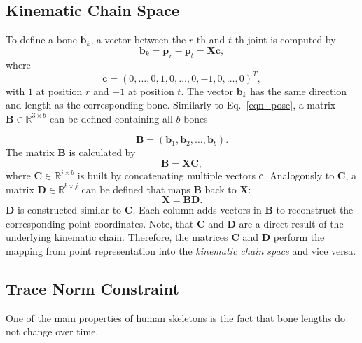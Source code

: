 \documentclass[10pt,letterpaper]{article}
\begin{document}
\subsection{Kinematic Chain Space}
\label{sec_bone_space}
To define a bone $\bm{b}_k$, a vector between the $r$-th and $t$-th joint is computed by
\begin{equation}
\label{eqn_bone_diff}
\bm{b}_k=\bm{p}_r-\bm{p}_t=\bm{X}\bm{c}
,
\end{equation}
where
\begin{equation}
\bm{c}=(0,\dots, 0, 1, 0, \dots, 0 ,-1 ,0 ,\dots,0)^T
,
\end{equation}
with $1$ at position $r$ and $-1$ at position $t$. The vector $\bm{b}_k$ has the same direction and length as the corresponding bone. Similarly to Eq.~\eqref{eqn_pose}, a matrix $\bm{B} \in \mathbb{R}^{3\times b}$ can be defined containing all $b$ bones

\begin{equation}
\label{eqn_bone}
\bm{B}=(\bm{b}_1, \bm{b}_2, \dots, \bm{b}_b)
.
\end{equation}
The matrix $\bm{B}$ is calculated by 
\begin{equation}
\label{eqn_kin_space}
\bm{B}=\bm{X}\bm{C}
,
\end{equation}
where $\bm{C}\in \mathbb{R}^{j\times b}$ is built by concatenating multiple vectors $\bm{c}$. Analogously to $\bm{C}$, a matrix $\bm{D}\in \mathbb{R}^{b\times j}$ can be defined that maps $\bm{B}$ back to $\bm{X}$:
\begin{equation}
\label{eqn_map_bone_to_point}
\bm{X}=\bm{B}\bm{D}
.
\end{equation}
$\bm{D}$ is constructed similar to $\bm{C}$. Each column adds vectors in $\bm{B}$ to reconstruct the corresponding point coordinates. Note, that $\bm{C}$ and $\bm{D}$ are a direct result of the underlying kinematic chain. Therefore, the matrices $\bm{C}$ and $\bm{D}$ perform the mapping from point representation into the \textit{kinematic chain space} and vice versa.

\subsection{Trace Norm Constraint}
\label{sec_problem}
One of the main properties of human skeletons is the fact that bone lengths do not change over time.
\end{document}

